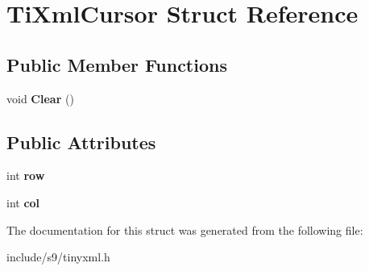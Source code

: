 \hypertarget{structTiXmlCursor}{\section{Ti\-Xml\-Cursor Struct Reference}
\label{structTiXmlCursor}
}
\subsection*{Public Member Functions}
\begin{DoxyCompactItemize}
\item 
\hypertarget{structTiXmlCursor_a1e6fa622b59dafb71b6efe595105dcdd}{void {\bfseries Clear} ()}\label{structTiXmlCursor_a1e6fa622b59dafb71b6efe595105dcdd}

\end{DoxyCompactItemize}
\subsection*{Public Attributes}
\begin{DoxyCompactItemize}
\item 
\hypertarget{structTiXmlCursor_a5b54dd949820c2db061e2be41f3effb3}{int {\bfseries row}}\label{structTiXmlCursor_a5b54dd949820c2db061e2be41f3effb3}

\item 
\hypertarget{structTiXmlCursor_a5694d7ed2c4d20109d350c14c417969d}{int {\bfseries col}}\label{structTiXmlCursor_a5694d7ed2c4d20109d350c14c417969d}

\end{DoxyCompactItemize}


The documentation for this struct was generated from the following file\-:\begin{DoxyCompactItemize}
\item 
include/s9/tinyxml.\-h\end{DoxyCompactItemize}
